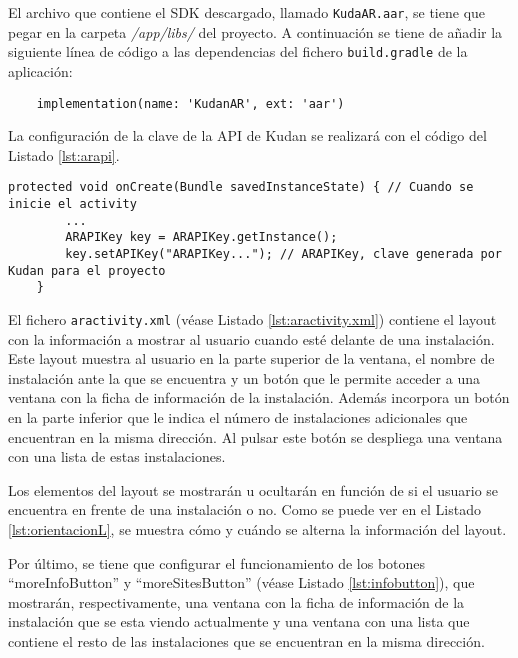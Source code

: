 El archivo que contiene el SDK descargado, llamado \texttt{KudaAR.aar}, se tiene que pegar en la carpeta \textit{/app/libs/} del proyecto. A continuación se tiene de añadir la siguiente línea de código a las dependencias del fichero \texttt{build.gradle} de la aplicación:

\begin{lstlisting}
    implementation(name: 'KudanAR', ext: 'aar')
\end{lstlisting}

La configuración de la clave de la API de Kudan se realizará con el código del Listado \ref{lst:arapi}.

\begin{lstlisting}[caption={Fichero \texttt{ARNavigation.java}, código para configurar la API de Kudan.},  label={lst:arapi}]
    protected void onCreate(Bundle savedInstanceState) { // Cuando se inicie el activity
        ...
        ARAPIKey key = ARAPIKey.getInstance(); 
        key.setAPIKey("ARAPIKey..."); // ARAPIKey, clave generada por Kudan para el proyecto
    }
\end{lstlisting}
 
El fichero \texttt{aractivity.xml} (véase Listado \ref{lst:aractivity.xml}) contiene el layout con la información a mostrar al usuario cuando esté delante de una instalación. Este layout muestra al usuario en la parte superior de la ventana, el nombre de instalación ante la que se encuentra y un botón que le permite acceder a una ventana con la ficha de información de la instalación. Además incorpora un botón en la parte inferior que le indica el número de instalaciones adicionales que encuentran en la misma dirección. Al pulsar este botón se despliega una ventana con una lista de estas instalaciones.



Los elementos del layout se mostrarán u ocultarán en función de si el usuario se  encuentra en frente de una instalación o no. Como se puede ver en el Listado \ref{lst:orientacionL}, se muestra cómo y cuándo se alterna la información del layout.

Por último, se tiene que configurar el funcionamiento de los botones ``moreInfoButton'' y ``moreSitesButton'' (véase Listado \ref{lst:infobutton}), que mostrarán, respectivamente, una ventana con la ficha de información de la instalación que se esta viendo actualmente y una ventana con una lista que contiene el resto de las instalaciones que se encuentran en la misma dirección. 

